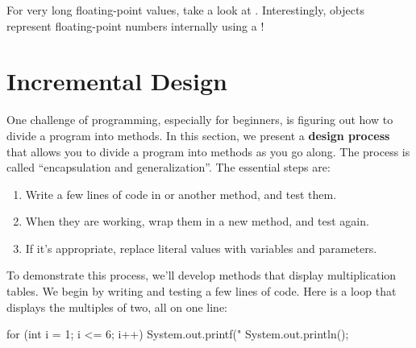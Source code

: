 For very long floating-point values, take a look at .
Interestingly,  objects represent floating-point numbers internally using a !



\section{Incremental Design}
\label{encapsulation}




One challenge of programming, especially for beginners, is figuring out how to divide a program into methods.
In this section, we present a {\bf design process} that allows you to divide a program into methods as you go along.
The process is called ``encapsulation and generalization''.
The essential steps are:

\begin{enumerate}
\item Write a few lines of code in  or another method, and test them.
\item When they are working, wrap them in a new method, and test again.
\item If it's appropriate, replace literal values with variables and parameters.
\end{enumerate}


To demonstrate this process, we'll develop methods that display multiplication tables.
We begin by writing and testing a few lines of code.
Here is a loop that displays the multiples of two, all on one line:

\begin{code}
for (int i = 1; i <= 6; i++) {
    System.out.printf("%
}
System.out.println();
\end{code}

